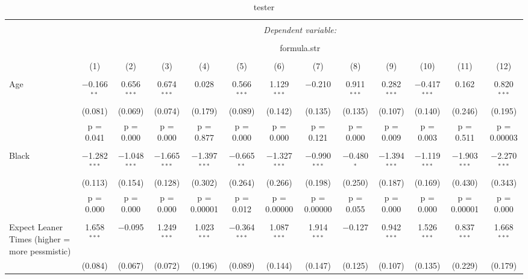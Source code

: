\documentclass{article}
\begin{document}
\begin{landscape}
\setlength\LTleft{0pt}
\setlength\LTright{0pt}
\begin{longtable}{@{\extracolsep{5pt}}lcccccccccccc} 
  \caption{tester} 
  \label{} 
\\[-1.8ex]\hline 
\endhead
\hline \\[-1.8ex] 
 & \multicolumn{12}{c}{\textit{Dependent variable:}} \\ 
\cline{2-13} 
\\[-1.8ex] & \multicolumn{12}{c}{formula.str} \\ 
\\[-1.8ex] & (1) & (2) & (3) & (4) & (5) & (6) & (7) & (8) & (9) & (10) & (11) & (12)\\ 
\hline \\[-1.8ex] 
 Age & $-$0.166$^{**}$ & 0.656$^{***}$ & 0.674$^{***}$ & 0.028 & 0.566$^{***}$ & 1.129$^{***}$ & $-$0.210 & 0.911$^{***}$ & 0.282$^{***}$ & $-$0.417$^{***}$ & 0.162 & 0.820$^{***}$ \\ 
  & (0.081) & (0.069) & (0.074) & (0.179) & (0.089) & (0.142) & (0.135) & (0.135) & (0.107) & (0.140) & (0.246) & (0.195) \\ 
  & p = 0.041 & p = 0.000 & p = 0.000 & p = 0.877 & p = 0.000 & p = 0.000 & p = 0.121 & p = 0.000 & p = 0.009 & p = 0.003 & p = 0.511 & p = 0.00003 \\ 
  & & & & & & & & & & & & \\ 
 Black & $-$1.282$^{***}$ & $-$1.048$^{***}$ & $-$1.665$^{***}$ & $-$1.397$^{***}$ & $-$0.665$^{**}$ & $-$1.327$^{***}$ & $-$0.990$^{***}$ & $-$0.480$^{*}$ & $-$1.394$^{***}$ & $-$1.119$^{***}$ & $-$1.903$^{***}$ & $-$2.270$^{***}$ \\ 
  & (0.113) & (0.154) & (0.128) & (0.302) & (0.264) & (0.266) & (0.198) & (0.250) & (0.187) & (0.169) & (0.430) & (0.343) \\ 
  & p = 0.000 & p = 0.000 & p = 0.000 & p = 0.00001 & p = 0.012 & p = 0.00000 & p = 0.00000 & p = 0.055 & p = 0.000 & p = 0.000 & p = 0.00001 & p = 0.000 \\ 
  & & & & & & & & & & & & \\ 
 Expect Leaner Times (higher = more pessmistic) & 1.658$^{***}$ & $-$0.095 & 1.249$^{***}$ & 1.023$^{***}$ & $-$0.364$^{***}$ & 1.087$^{***}$ & 1.914$^{***}$ & $-$0.127 & 0.942$^{***}$ & 1.526$^{***}$ & 0.837$^{***}$ & 1.668$^{***}$ \\ 
  & (0.084) & (0.067) & (0.072) & (0.196) & (0.089) & (0.144) & (0.147) & (0.125) & (0.107) & (0.135) & (0.229) & (0.179) \\ 

\end{longtable}
\end{landscape}
\end{document}
